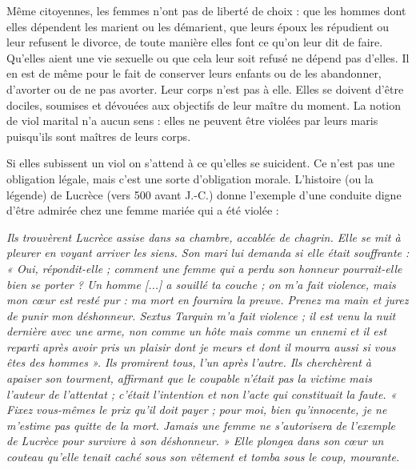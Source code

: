  Même citoyennes, les femmes n'ont pas de liberté de choix : que les hommes dont elles dépendent les marient ou les démarient, que leurs époux les répudient ou leur refusent le divorce, de toute manière elles font ce qu'on leur dit de faire. Qu'elles aient une vie sexuelle ou que cela leur soit refusé ne dépend pas d'elles. Il en est de même pour le fait de conserver leurs enfants ou de les abandonner, d'avorter ou de ne pas avorter. Leur corps n'est pas à elle. Elles se doivent d'être dociles, soumises et dévouées aux objectifs de leur maître du moment. La notion de viol marital n'a aucun sens : elles ne peuvent être violées par leurs maris puisqu'ils sont maîtres de leurs corps.

 Si elles subissent un viol on s'attend à ce qu'elles se suicident. Ce n'est pas une obligation légale, mais c'est une sorte d'obligation morale. L'histoire (ou la légende) de Lucrèce (vers 500 avant J.-C.) donne l'exemple d'une conduite digne d'être admirée chez une femme mariée qui a été violée :

\begin{displayquote}
\emph{Ils trouvèrent Lucrèce assise dans sa chambre, accablée de chagrin. Elle se mit à pleurer en voyant arriver les siens. Son mari lui demanda si elle était souffrante : « Oui, répondit-elle ; comment une femme qui a perdu son honneur pourrait-elle bien se porter ? Un homme \emph{[...]} a souillé ta couche ; on m'a fait violence, mais mon cœur est resté pur : ma mort en fournira la preuve. Prenez ma main et jurez de punir mon déshonneur. Sextus Tarquin m'a fait violence ; il est venu la nuit dernière avec une arme, non comme un hôte mais comme un ennemi et il est reparti après avoir pris un plaisir dont je meurs et dont il mourra aussi si vous êtes des hommes ». Ils promirent tous, l'un après l'autre. Ils cherchèrent à apaiser son tourment, affirmant que le coupable n'était pas la victime mais l'auteur de l'attentat ; c'était l'intention et non l'acte qui constituait la faute. « Fixez vous-mêmes le prix qu'il doit payer ; pour moi, bien qu'innocente, je ne m'estime pas quitte de la mort. Jamais une femme ne s'autorisera de l'exemple de Lucrèce pour survivre à son déshonneur. » Elle plongea dans son cœur un couteau qu'elle tenait caché sous son vêtement et tomba sous le coup, mourante.}
\end{displayquote}

